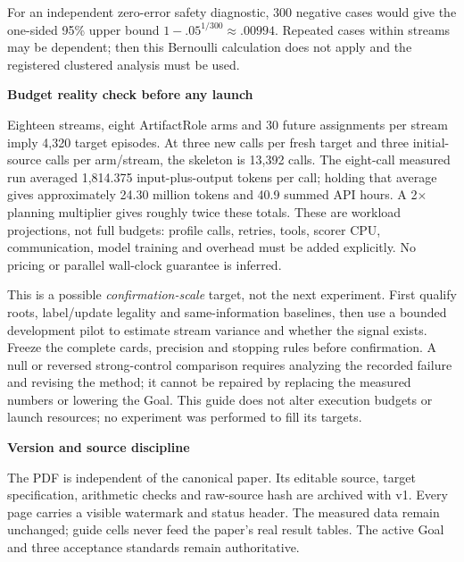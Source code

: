 \documentclass[10pt,a4paper]{article}
\newcommand{\lead}[1]{\vspace{4pt}\textbf{#1}\par}
\begin{document}
For an independent zero-error safety diagnostic, 300 negative cases would give
the one-sided 95\% upper bound $1-.05^{1/300}\approx.00994$.
Repeated cases within streams may be dependent; then this Bernoulli calculation
does not apply and the registered clustered analysis must be used.

\lead{Budget reality check before any launch}
Eighteen streams, eight ArtifactRole arms and 30 future assignments per stream
imply 4,320 target episodes. At three new calls per fresh target and three
initial-source calls per arm/stream, the skeleton is 13,392 calls.
The eight-call measured run averaged 1,814.375 input-plus-output tokens per call;
holding that average gives approximately 24.30 million tokens and
40.9 summed API hours. A 2$\times$ planning multiplier gives roughly twice
these totals. These are workload projections, not full budgets: profile calls,
retries, tools, scorer CPU, communication, model training and overhead must be
added explicitly. No pricing or parallel wall-clock guarantee is inferred.

This is a possible \emph{confirmation-scale} target, not the next experiment.
First qualify roots, label/update legality and same-information baselines, then
use a bounded development pilot to estimate stream variance and whether the
signal exists. Freeze the complete cards, precision and stopping rules before
confirmation. A null or reversed strong-control comparison requires analyzing
the recorded failure and revising the method; it cannot be repaired by replacing
the measured numbers or lowering the Goal. This guide does not alter execution
budgets or launch resources; no experiment was performed to fill its targets.

\lead{Version and source discipline}
The PDF is independent of the canonical paper. Its editable source, target
specification, arithmetic checks and raw-source hash are archived with v1.
Every page carries a visible watermark and status header. The measured data
remain unchanged; guide cells never feed the paper's real result tables.
The active Goal and three acceptance standards remain authoritative.
\end{document}

